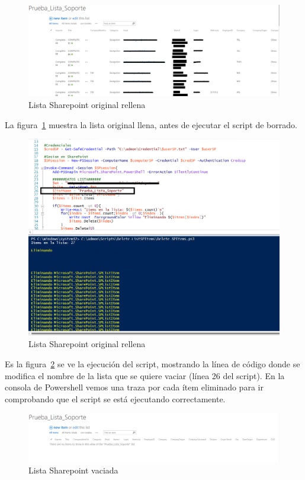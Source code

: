 \documentclass[a4paper, 12pt]{book}
\begin{document}
\begin{itemize}
\begin{figure}[h]
	\centering
	\includegraphics[width=17cm, keepaspectratio]{img/image15.png}
	\caption{Lista Sharepoint original rellena}
	\label{fig:image15}
\end{figure}

La figura~\ref{fig:image15} muestra la lista original llena, antes de ejecutar el script de borrado.

\begin{figure}
	\centering
	\includegraphics[width=17cm, keepaspectratio]{img/image16.png}
	\caption{Lista Sharepoint original rellena}
	\label{fig:image16}
\end{figure}

Es la figura~\ref{fig:image16} se ve la ejecución del script, mostrando la línea de código donde se modifica el nombre de la lista que se quiere vaciar (línea 26 del script). En la consola de Powershell vemos una traza por cada ítem eliminado para ir comprobando que el script se está ejecutando correctamente.

\begin{figure}
	\centering
	\includegraphics[width=17cm, keepaspectratio]{img/image12.png}
	\caption{Lista Sharepoint vaciada}
	\label{fig:image12}
\end{figure}


\end{itemize}
\end{document}
